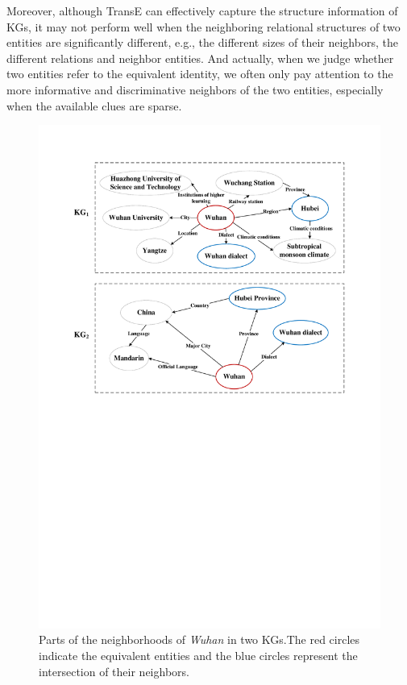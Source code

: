 	Moreover, although TransE can effectively capture the structure information of KGs, it may not perform well when the neighboring relational structures of two entities are significantly different, e.g., the different sizes of their neighbors, the different relations and neighbor entities. And actually, when we judge whether two entities refer to the equivalent identity, we often only pay attention to the more informative and discriminative neighbors of the two entities, especially when the available clues are sparse.
	\begin{figure}
		\begin{center}
			\includegraphics[width=1\linewidth]{figures/graph1.pdf}
			\caption{Parts of the neighborhoods of \textit{Wuhan} in two KGs.The red circles indicate the equivalent entities and the blue circles represent the intersection of their neighbors.}
			\label{Wuhan}
		\end{center}
	\end{figure}
